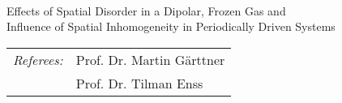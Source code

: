 \begin{titlepage}
    \begin{addmargin}[-1cm]{-3cm}
    \begin{center}
        \large

        \hfill

        \vfill

        \begingroup
            \color{CTtitle} \\ \bigskip\bigskip
        Effects of Spatial Disorder in a Dipolar, Frozen Gas and\\
        Influence of Spatial Inhomogeneity in Periodically Driven Systems
        \endgroup

        \vfill

    \end{center}
    \vfill
    \begin{center}
        \begin{tabular}{ll}
             \textit{Referees:}\hspace{0.5cm} & Prof. Dr. Martin Gärttner\\
             & Prof. Dr. Tilman Enss
        \end{tabular}
    \end{center}
  \end{addmargin}
\end{titlepage}
